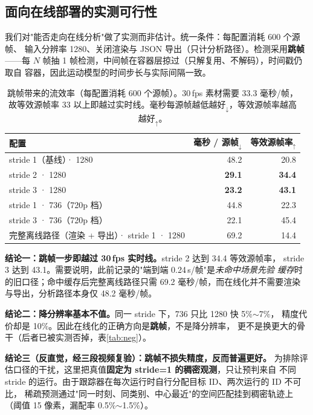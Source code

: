 \documentclass[11pt,a4paper]{ctexart}
\newcommand{\up}{$_{\uparrow}$}
\newcommand{\dn}{$_{\downarrow}$}
\begin{document}
\subsection{面向在线部署的实测可行性}
\label{sec:stream}

我们对"能否走向在线分析"做了实测而非估计。统一条件：每配置消耗 600 个源帧、
输入分辨率 1280、关闭渲染与 JSON 导出（只计分析路径）。检测采用\textbf{跳帧}
——每 $N$ 帧抽 1 帧检测，中间帧在容器层掠过（只解复用、不解码），时间戳仍取自
容器，因此运动模型的时间步长与实际间隔一致。

\begin{table}[t]\centering\small
\caption{跳帧带来的流效率（每配置消耗 600 个源帧）。30\,fps 素材需要 33.3 毫秒/帧，
故等效源帧率 33 以上即越过实时线。毫秒每源帧越低越好\dn，等效源帧率越高越好\up。}
\label{tab:stream}
\begin{tabular}{lrr}
\toprule
配置 & 毫秒 / 源帧\dn & 等效源帧率\up \\
\midrule
stride 1（基线）· 1280 & 48.2 & 20.8 \\
stride 2 · 1280 & \textbf{29.1} & \textbf{34.4} \\
stride 3 · 1280 & \textbf{23.2} & \textbf{43.1} \\
stride 1 · 736（720p 档） & 44.8 & 22.3 \\
stride 3 · 736（720p 档） & 22.1 & 45.4 \\
\midrule
完整离线路径（渲染 + 导出）· stride 1 · 1280 & 69.2 & 14.4 \\
\bottomrule
\end{tabular}
\end{table}

\textbf{结论一：跳帧一步即越过 30\,fps 实时线。}stride 2 达到 34.4 等效源帧率，
stride 3 达到 43.1。需要说明，此前记录的"端到端 0.24\,s/帧"是\emph{未命中场景先验
缓存}时的旧口径；命中缓存后完整离线路径只需 69.2 毫秒/帧，而在线化并不需要渲染
与导出，分析路径本身仅 48.2 毫秒/帧。

\textbf{结论二：降分辨率基本不值。}同一 stride 下，736 只比 1280 快 5\%$\sim$7\%，
精度代价却是 10\%。因此在线化的正确方向是\textbf{跳帧}，不是降分辨率，
更不是换更大的骨干（后者已被实测否掉，表\ref{tab:neg}）。

\textbf{结论三（反直觉，经三段视频复验）：跳帧不损失精度，反而普遍更好。}
为排除评估口径的干扰，这里把真值\textbf{固定为 stride=1 的稠密观测}，只让预判来自
不同 stride 的运行。由于跟踪器在每次运行时自行分配目标 ID、两次运行的 ID 不可比，
稀疏预测通过"同一时刻、同类别、中心最近"的空间匹配挂到稠密轨迹上
（阈值 15 像素，漏配率 0.5\%$\sim$1.5\%）。
\end{document}
